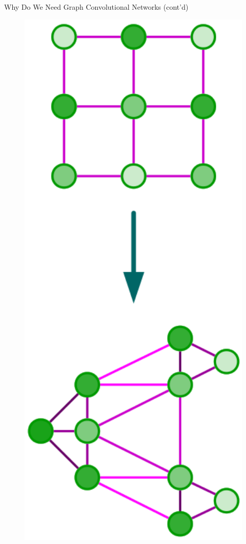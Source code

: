\documentclass{beamer}
\begin{document}
\begin{frame}{Why Do We Need Graph Convolutional Networks (cont'd)}
\begin{minipage}[t]{.4\textwidth}
\begin{figure}[ht]
      \includegraphics[width=1.0\textwidth, height=0.7\textheight, keepaspectratio]{img/problem}
      \label{fig:problem}
    \end{figure}

  \end{minipage}

\end{frame}
\end{document}
